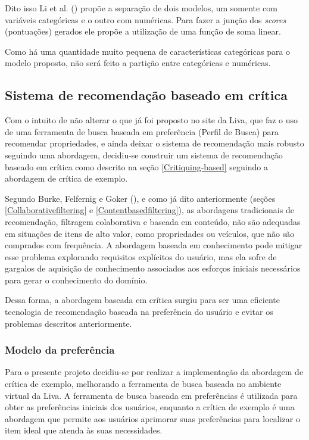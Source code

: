 Dito isso Li et al. (\citeyear{Summo:2017}) propõe a separação de dois modelos, um somente com variáveis categóricas e o outro com numéricas. Para fazer a junção dos \textit{scores} (pontuações) gerados ele propõe a utilização de uma função de soma linear.

Como há uma quantidade muito pequena de características categóricas para o modelo proposto, não será feito a partição entre categóricas e numéricas.

\subsection{Sistema de recomendação baseado em crítica}
\label{exemple-critiquing}

Com o intuito de não alterar o que já foi proposto no site da Liva, que faz o uso de uma ferramenta de busca baseada em preferência (Perfil de Busca) para recomendar propriedades, e ainda deixar o sistema de recomendação mais robusto seguindo uma abordagem, decidiu-se construir um sistema de recomendação baseado em crítica como descrito na seção \ref{Critiquing-based} seguindo a abordagem de crítica de exemplo.
	
Segundo Burke, Felfernig e Goker (\citeyear{Burke}), e como já dito anteriormente (seções \ref{Collaborativefiltering} e \ref{Contentbasedfiltering}), as abordagens tradicionais de recomendação, filtragem colaborativa e baseada em conteúdo, não são adequadas em situações de itens de alto valor, como propriedades ou veículos, que não são comprados com frequência. A abordagem baseada em conhecimento pode mitigar esse problema explorando requisitos explícitos do usuário, mas ela sofre de gargalos de aquisição de conhecimento associados aos esforços iniciais necessários para gerar o conhecimento do domínio.

Dessa forma, a abordagem baseada em crítica surgiu para ser uma eficiente tecnologia de recomendação baseada na preferência do usuário e evitar os problemas descritos anteriormente.

\subsubsection{Modelo da preferência}

Para o presente projeto decidiu-se por realizar a implementação da abordagem de crítica de exemplo, melhorando a ferramenta de busca baseada no ambiente virtual da Liva. A ferramenta de busca baseada em preferências é utilizada para obter as preferências iniciais dos usuários, enquanto a crítica de exemplo é uma abordagem que permite aos usuários aprimorar suas preferências para localizar o item ideal que atenda às suas necessidades.

